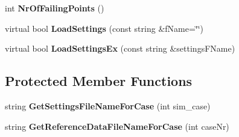 \begin{DoxyCompactItemize}
\item 
\hypertarget{classrr_1_1_test_suite_model_simulation_af91c62936cdedf4a3c13efc847703206}{int {\bfseries Nr\-Of\-Failing\-Points} ()}\label{classrr_1_1_test_suite_model_simulation_af91c62936cdedf4a3c13efc847703206}

\item 
\hypertarget{classrr_1_1_test_suite_model_simulation_a7b7b403bef96bd72203f04c56a431c22}{virtual bool {\bfseries Load\-Settings} (const string \&f\-Name=\char`\"{}\char`\"{})}\label{classrr_1_1_test_suite_model_simulation_a7b7b403bef96bd72203f04c56a431c22}

\item 
\hypertarget{classrr_1_1_test_suite_model_simulation_a9017d8cc80bd95b254a0137d65d26e08}{virtual bool {\bfseries Load\-Settings\-Ex} (const string \&settings\-F\-Name)}\label{classrr_1_1_test_suite_model_simulation_a9017d8cc80bd95b254a0137d65d26e08}

\end{DoxyCompactItemize}
\subsection*{Protected Member Functions}
\begin{DoxyCompactItemize}
\item 
\hypertarget{classrr_1_1_test_suite_model_simulation_ab043cb27a75925c6ae1fb9e975549265}{string {\bfseries Get\-Settings\-File\-Name\-For\-Case} (int sim\-\_\-case)}\label{classrr_1_1_test_suite_model_simulation_ab043cb27a75925c6ae1fb9e975549265}

\item 
\hypertarget{classrr_1_1_test_suite_model_simulation_ac1458a90bafac9f8dc4c9f3b89d310cf}{string {\bfseries Get\-Reference\-Data\-File\-Name\-For\-Case} (int case\-Nr)}\label{classrr_1_1_test_suite_model_simulation_ac1458a90bafac9f8dc4c9f3b89d310cf}

\end{DoxyCompactItemize}
